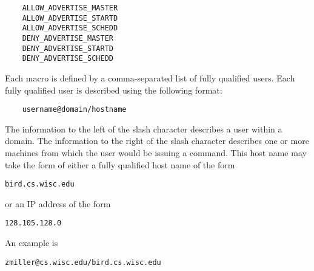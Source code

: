 \begin{verbatim}
    ALLOW_ADVERTISE_MASTER
    ALLOW_ADVERTISE_STARTD
    ALLOW_ADVERTISE_SCHEDD
    DENY_ADVERTISE_MASTER
    DENY_ADVERTISE_STARTD
    DENY_ADVERTISE_SCHEDD
\end{verbatim}

Each macro is defined by a comma-separated list of fully qualified
users.
Each
fully qualified user
is described using the following format:
\begin{verbatim}
    username@domain/hostname
\end{verbatim}
The information to the left of the slash character describes
a user within a domain.
The information to the right of the slash character describes
one or more machines from which the user would be issuing a command. 
This host name may take the form of either a fully qualified host name
of the form
\begin{verbatim}
bird.cs.wisc.edu
\end{verbatim}
or an IP address
of the form
\begin{verbatim}
128.105.128.0
\end{verbatim}

An example is
\begin{verbatim}
zmiller@cs.wisc.edu/bird.cs.wisc.edu
\end{verbatim}

